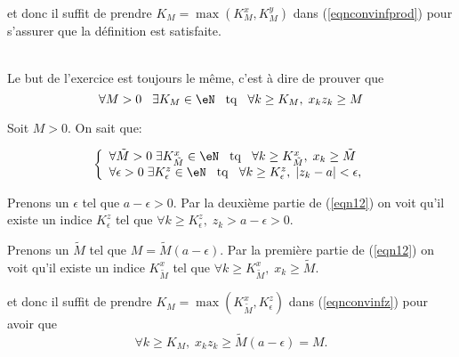 \noindent et donc il suffit  de prendre  $K_M = \max(K_M^x, K_M^y)$ dans (\ref{eqnconvinfprod}) pour s'assurer que la définition est satisfaite.

\vspace{0.5cm}
\\

Le but de l'exercice est toujours le même, c'est à dire de prouver que 
\begin{equation}		\label{eqnconvinfz}
  \forall M > 0 \hspace{0.3cm} \exists K_M \in \eN \hspace{0.3cm} {\rm tq} \hspace{0.3cm} \forall k \geq K_M, \;x_k  z_k \geq M 
\end{equation}

\noindent Soit $M>0$. On sait  que:

\begin{equation}
\label{eqn12}\left\{\begin{array}{l}   
        \forall \tilde{M} >0 \;\exists K^x_{\tilde{M}} \in \eN \hspace{0.3cm} {\rm tq} \hspace{0.3cm} \forall k \geq K^x_{\tilde{M}},\; x_k \geq  \tilde{M} \\																		 
       \forall \epsilon >0\;\exists K^z_\epsilon \in \eN \hspace{0.3cm} {\rm tq} \hspace{0.3cm} \forall k \geq K^z_\epsilon,\; |z_k-a| <\epsilon,																		
\end{array}\right.\end{equation}

\noindent Prenons un $\epsilon$ tel que $a-\epsilon>0$. Par la deuxième partie de (\ref{eqn12}) on voit qu'il existe un indice $ K^z_\epsilon$ tel que $ \forall k \geq K^z_\epsilon,\; z_k > a-\epsilon >0$.

\noindent Prenons un $\tilde{M}$ tel que $M= \tilde{M}(a-\epsilon)$. Par la première partie de (\ref{eqn12}) on voit qu'il existe un indice $ K^x_{\tilde{M}} $ tel que $\forall k \geq K^x_{\tilde{M}},\; x_k \geq  \tilde{M} $.

												
\noindent et donc il suffit  de prendre  $K_M = \max(K_{\tilde{M}}^x, K^z_\epsilon)$ dans (\ref{eqnconvinfz}) pour avoir que 
\[ \forall k \geq K_M, \;x_k  z_k \geq \tilde{M}(a-\epsilon)=M.\]


